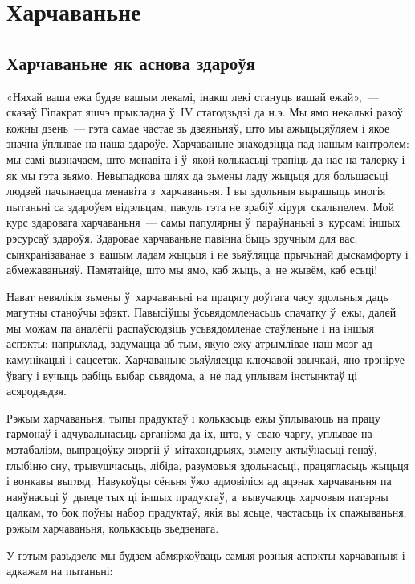 \chapter{Харчаваньне}

\section{Харчаваньне як аснова здароўя}

«Няхай ваша ежа будзе вашым лекамі, інакш лекі стануць вашай ежай»,~--- сказаў Гіпакрат яшчэ прыкладна ў~IV стагодзьдзі да н.э. Мы ямо некалькі разоў кожны дзень~--- гэта самае частае зь дзеяньняў, што мы ажыцьцяўляем і якое значна ўплывае на наша здароўе. Харчаваньне знаходзіцца пад нашым кантролем: мы самі вызначаем, што менавіта і ў~якой колькасьці трапіць да нас на талерку і як мы гэта зьямо. Невыпадкова шлях да зьмены ладу жыцьця для большасьці людзей пачынаецца менавіта з~харчаваньня. І вы здольныя вырашыць многія пытаньні са здароўем відэльцам, пакуль гэта не зрабіў хірург скальпелем. Мой курс здаровага харчаваньня~--- самы папулярны ў~параўнаньні з~курсамі іншых рэсурсаў здароўя. Здаровае харчаваньне павінна быць зручным для вас, сынхранізаванае з~вашым ладам жыцьця і не зьяўляцца прычынай дыскамфорту і абмежаваньняў. Памятайце, што мы ямо, каб жыць, а~не жывём, каб есьці!

Нават невялікія зьмены ў~харчаваньні на працягу доўгага часу здольныя даць магутны станоўчы эфэкт. Павысіўшы ўсьвядомленасьць спачатку ў~ежы, далей мы можам па аналёгіі распаўсюдзіць усьвядомленае стаўленьне і на іншыя аспэкты: напрыклад, задумацца аб тым, якую ежу атрымлівае наш мозг ад камунікацыі і сацсетак. Харчаваньне зьяўляецца ключавой звычкай, яно трэніруе ўвагу і вучыць рабіць выбар сьвядома, а~не пад уплывам інстынктаў ці асяродзьдзя.

Рэжым харчаваньня, тыпы прадуктаў і колькасьць ежы ўплываюць на працу гармонаў і адчувальнасьць арганізма да іх, што, у~сваю чаргу, уплывае на мэтабалізм, выпрацоўку энэргіі ў~мітахондрыях, зьмену актыўнасьці генаў, глыбіню сну, трывушчасьць, лібіда, разумовыя здольнасьці, працягласьць жыцьця і вонкавы выгляд. Навукоўцы сёньня ўжо адмовіліся ад ацэнак харчаваньня па наяўнасьці ў~дыеце тых ці іншых прадуктаў, а~вывучаюць харчовыя патэрны цалкам, то бок поўны набор прадуктаў, якія вы ясьце, частасьць іх спажываньня, рэжым харчаваньня, колькасьць зьедзенага.

У гэтым разьдзеле мы будзем абмяркоўваць самыя розныя аспэкты харчаваньня і адкажам на пытаньні: 

